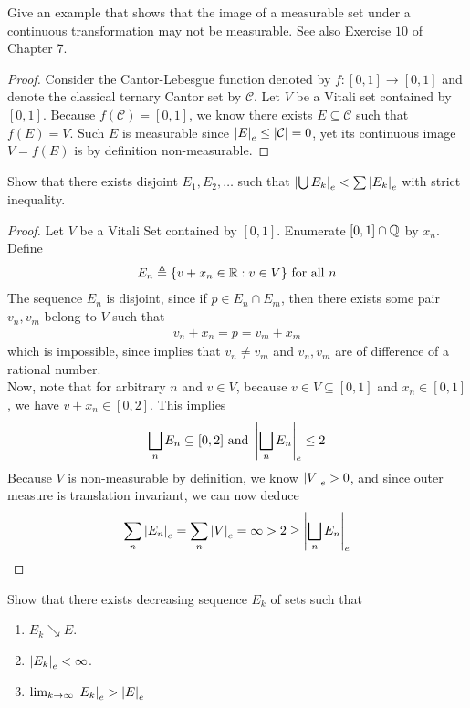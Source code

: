 \documentclass{report}
\begin{document}
\begin{question}{}{}
Give an example that shows that the image of a measurable set under a continuous transformation may not be measurable. See also Exercise $10$ of Chapter 7. 
\end{question}
\begin{proof}
Consider the Cantor-Lebesgue function denoted by $f:[0,1]\rightarrow [0,1]$ and denote the classical ternary Cantor set by $\mathcal{C}$. Let  $V$ be a Vitali set contained by  $[0,1]$. Because $f(\mathcal{C})=[0,1]$, we know there exists $E\subseteq \mathcal{C}$ such that $f(E)=V$. Such $E$ is measurable since $\left|E\right|_e\leq \left|\mathcal{C}\right|=0$, yet its continuous image $V=f(E)$ is by definition non-measurable. 
\end{proof}
\begin{question}{}{}
Show that there exists disjoint $E_1,E_2,\dots $ such that $\left|\bigcup E_k\right|_e< \sum \left|E_k\right|_e$ with strict inequality. 
\end{question}
\begin{proof}
Let  $V$ be a Vitali Set contained by $[0,1]$. Enumerate $[0,1]\cap \mathbb{Q}$ by $x_n$. Define 
 \begin{align*}
E_n\triangleq \{ v+x_n\in\mathbb{R}: v\in V \}\text{ for all }n
\end{align*}
The sequence $E_n$ is disjoint, since if  $p \in E_n \cap E_m$, then there exists some pair $v_n,v_m$ belong to  $V$ such that 
 \begin{align}
\label{vnxn}
v_n+x_n=p=v_m+x_m
\end{align}
which is impossible, since  implies that $v_n\neq v_m$ and $v_n,v_m$ are of difference of a rational number.  \\

Now, note that for arbitrary $n$ and  $v\in V$, because $v \in V \subseteq [0,1]$ and $x_n \in [0,1]$, we have $v+x_n\in [0,2]$. This implies 
\begin{align*}
\bigsqcup _n E_n \subseteq [0,2]\text{ and }\left|\bigsqcup _n E_n\right|_e \leq 2
\end{align*}
Because $V$ is non-measurable by definition, we know $\left|V\right|_e>0$, and since outer measure is translation invariant, we can now deduce 
\begin{align*}
\sum_n \left|E_n\right|_e= \sum_n \left|V\right|_e =\infty >2 \geq \left|\bigsqcup_n E_n\right|_e
\end{align*}
\end{proof}
\begin{question}{}{}
Show that there exists decreasing sequence $E_k$ of sets such that 
\begin{enumerate}[label=(\alph*)]
  \item $E_k\searrow E$.
  \item $\left|E_k\right|_e<\infty$.
  \item $\lim_{k\to \infty}\left|E_k\right|_e> \left|E\right|_e$
\end{enumerate}
\end{question}
\end{document}
